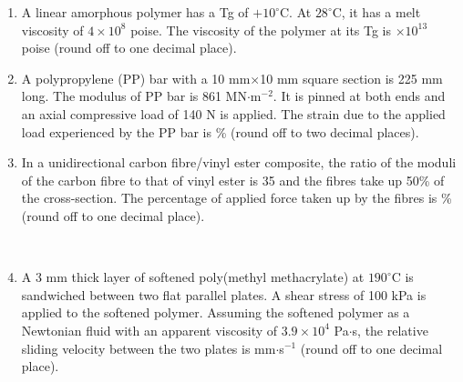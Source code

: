\documentclass[journal,12pt,onecolumn]{IEEEtran}
\begin{document}
\begin{enumerate}[label=\arabic*)]
\vspace{0.5cm}

\item A linear amorphous polymer has a Tg of $+10^\circ$C. At $28^\circ$C, it has a melt viscosity of $4\times10^{8}$ poise. The viscosity of the polymer at its Tg is \underline{\hspace{2cm}}$\times10^{13}$ poise (round off to one decimal place).
\vspace{0.05cm}
\hfill{} \\

\vspace{0.5cm}

\item A polypropylene (PP) bar with a 10 mm$\times$10 mm square section is 225 mm long. The modulus of PP bar is 861 MN$\cdot$m$^{-2}$. It is pinned at both ends and an axial compressive load of 140 N is applied. The strain due to the applied load experienced by the PP bar is \underline{\hspace{2cm}}\% (round off to two decimal places).
\hfill{} \\

\newpage

\item In a unidirectional carbon fibre/vinyl ester composite, the ratio of the moduli of the carbon fibre to that of vinyl ester is 35 and the fibres take up 50\% of the cross-section. The percentage of applied force taken up by the fibres is \underline{\hspace{1cm}}\% (round off to one decimal place).

\hfill{} \\

\vspace{0.5cm}

\item A 3 mm thick layer of softened poly(methyl methacrylate) at $190^\circ$C is sandwiched between two flat parallel plates. A shear stress of 100 kPa is applied to the softened polymer. Assuming the softened polymer as a Newtonian fluid with an apparent viscosity of $3.9\times10^{4}$ Pa$\cdot$s, the relative sliding velocity between the two plates is \underline{\hspace{2cm}} mm$\cdot$s$^{-1}$ (round off to one decimal place).
\hfill{} \\

\vspace{0.5cm}


\end{enumerate}
\end{document}
